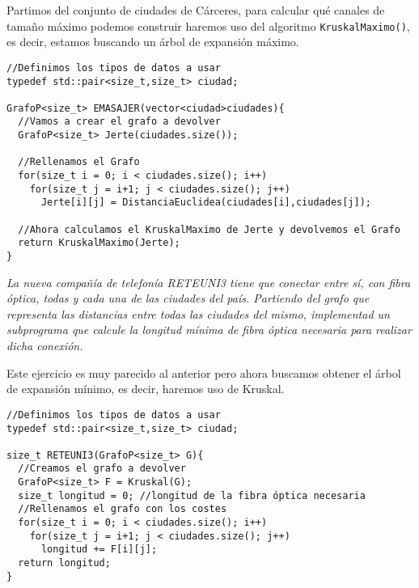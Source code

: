 Partimos del conjunto de ciudades de Cárceres, para calcular qué canales de tamaño máximo podemos construir haremos uso del algoritmo \texttt{KruskalMaximo()}, es decir, estamos buscando un árbol de expansión máximo.

\begin{verbatim}
//Definimos los tipos de datos a usar
typedef std::pair<size_t,size_t> ciudad;

GrafoP<size_t> EMASAJER(vector<ciudad>ciudades){
  //Vamos a crear el grafo a devolver
  GrafoP<size_t> Jerte(ciudades.size());

  //Rellenamos el Grafo
  for(size_t i = 0; i < ciudades.size(); i++)
    for(size_t j = i+1; j < ciudades.size(); j++)
      Jerte[i][j] = DistanciaEuclidea(ciudades[i],ciudades[j]);

  //Ahora calculamos el KruskalMaximo de Jerte y devolvemos el Grafo
  return KruskalMaximo(Jerte);
}
\end{verbatim}

\textbf{\large{}}\textit{ La nueva compañía de telefonía RETEUNI3 tiene que conectar entre sí, con fibra óptica, todas y cada una de las ciudades del país. Partiendo del grafo que representa las distancias entre todas las ciudades del mismo, implementad un subprograma que calcule la longitud mínima de fibra óptica necesaria para realizar dicha conexión.}

Este ejercicio es muy parecido al anterior pero ahora buscamos obtener el árbol de expansión mínimo, es decir, haremos uso de Kruskal.
\begin{verbatim}
//Definimos los tipos de datos a usar
typedef std::pair<size_t,size_t> ciudad;

size_t RETEUNI3(GrafoP<size_t> G){
  //Creamos el grafo a devolver
  GrafoP<size_t> F = Kruskal(G);
  size_t longitud = 0; //longitud de la fibra óptica necesaria
  //Rellenamos el grafo con los costes
  for(size_t i = 0; i < ciudades.size(); i++)
    for(size_t j = i+1; j < ciudades.size(); j++)
      longitud += F[i][j];
  return longitud;
}
\end{verbatim}

